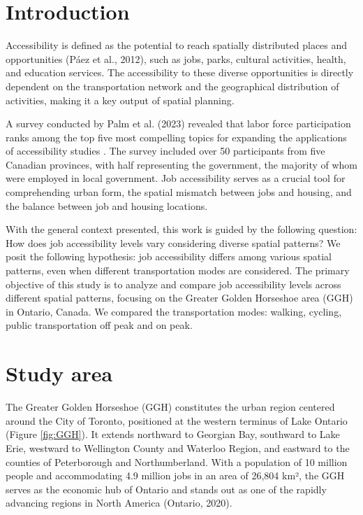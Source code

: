 \documentclass[conference,final,]{IEEEtran}
\begin{document}
\hypertarget{introduction}{%
\section{Introduction}\label{introduction}}

Accessibility is defined as the potential to reach spatially distributed
places and opportunities (Páez et al., 2012), such as jobs, parks,
cultural activities, health, and education services. The accessibility
to these diverse opportunities is directly dependent on the
transportation network and the geographical distribution of activities,
making it a key output of spatial planning.

A survey conducted by Palm et al. (2023) revealed that labor force
participation ranks among the top five most compelling topics for
expanding the applications of accessibility studies . The survey
included over 50 participants from five Canadian provinces, with half
representing the government, the majority of whom were employed in local
government. Job accessibility serves as a crucial tool for comprehending
urban form, the spatial mismatch between jobs and housing, and the
balance between job and housing locations.

With the general context presented, this work is guided by the following
question: How does job accessibility levels vary considering diverse
spatial patterns? We posit the following hypothesis: job accessibility
differs among various spatial patterns, even when different
transportation modes are considered. The primary objective of this study
is to analyze and compare job accessibility levels across different
spatial patterns, focusing on the Greater Golden Horseshoe area (GGH) in
Ontario, Canada. We compared the transportation modes: walking, cycling,
public transportation off peak and on peak.

\hypertarget{study-area}{%
\section{Study area}\label{study-area}}

The Greater Golden Horseshoe (GGH) constitutes the urban region centered
around the City of Toronto, positioned at the western terminus of Lake
Ontario (Figure \ref{fig:GGH}). It extends northward to Georgian Bay,
southward to Lake Erie, westward to Wellington County and Waterloo
Region, and eastward to the counties of Peterborough and Northumberland.
With a population of 10 million people and accommodating 4.9 million
jobs in an area of 26,804 km², the GGH serves as the economic hub of
Ontario and stands out as one of the rapidly advancing regions in North
America (Ontario, 2020).
\end{document}
